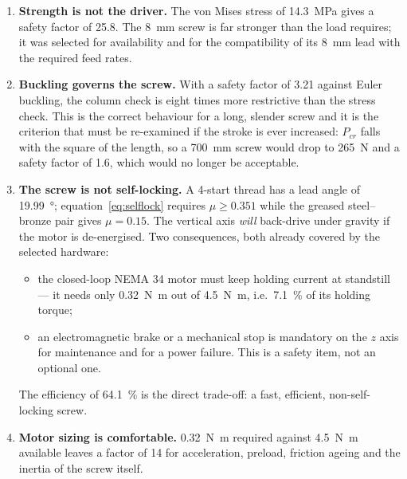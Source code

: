 \documentclass[11pt]{article}
\begin{document}
\begin{enumerate}[leftmargin=*]
  \item \textbf{Strength is not the driver.} The von Mises stress of \SI{14.3}{\mega\pascal}
        gives a safety factor of 25.8. The \SI{8}{\milli\metre} screw is far stronger than
        the load requires; it was selected for availability and for the compatibility of
        its \SI{8}{\milli\metre} lead with the required feed rates.
  \item \textbf{Buckling governs the screw.} With a safety factor of 3.21 against Euler
        buckling, the column check is eight times more restrictive than the stress check.
        This is the correct behaviour for a long, slender screw and it is the criterion
        that must be re-examined if the stroke is ever increased: $P_{cr}$ falls with the
        square of the length, so a \SI{700}{\milli\metre} screw would drop to
        \SI{265}{\newton} and a safety factor of 1.6, which would no longer be acceptable.
  \item \textbf{The screw is not self-locking.} A 4-start thread has a lead angle of
        \SI{19.99}{\degree}; equation~\eqref{eq:selflock} requires $\mu\ge0.351$ while the
        greased steel--bronze pair gives $\mu=0.15$. The vertical axis \emph{will}
        back-drive under gravity if the motor is de-energised. Two consequences, both
        already covered by the selected hardware:
        \begin{itemize}[nosep]
          \item the closed-loop NEMA 34 motor must keep holding current at standstill ---
                it needs only \SI{0.32}{\newton\metre} out of \SI{4.5}{\newton\metre},
                i.e.\ \SI{7.1}{\percent} of its holding torque;
          \item an electromagnetic brake or a mechanical stop is mandatory on the $z$ axis
                for maintenance and for a power failure. This is a safety item, not an
                optional one.
        \end{itemize}
        The efficiency of \SI{64.1}{\percent} is the direct trade-off: a fast, efficient,
        non-self-locking screw.
  \item \textbf{Motor sizing is comfortable.} \SI{0.32}{\newton\metre} required against
        \SI{4.5}{\newton\metre} available leaves a factor of 14 for acceleration,
        preload, friction ageing and the inertia of the screw itself.
\end{enumerate}
\end{document}
